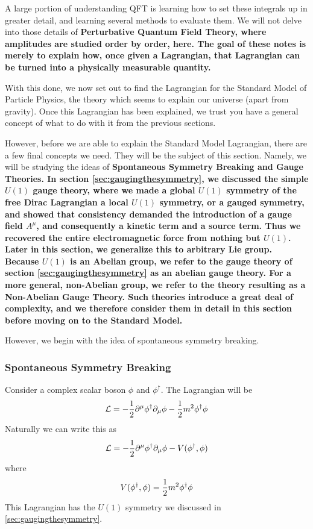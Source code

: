 \documentclass[12pt,epsf]{article}
\def\nolabel{\nonumber }
\def\nolabel{\nonumber }
\begin{document}
A large portion of understanding QFT is learning how to set these
integrals up in greater detail, and learning several methods to
evaluate them.	We will not delve into those details of \bf
Perturbative Quantum Field Theory\rm, where amplitudes are studied
order by order, here.  The goal of these notes is merely to explain
how, once given a Lagrangian, that Lagrangian can be turned into a
physically measurable quantity.  

With this done, we now set out to find the Lagrangian for the Standard
Model of Particle Physics, the theory which seems to explain our
universe (apart from gravity).	Once this Lagrangian has been
explained, we trust you have a general concept of what to do with it
from the previous sections.  

However, before we are able to explain the Standard Model Lagrangian,
there are a few final concepts we need.  They will be the subject of
this section.  Namely, we will be studying the ideas of \bf Spontaneous
Symmetry Breaking \rm and \bf Gauge Theories\rm.  In section
\ref{sec:gaugingthesymmetry}, we discussed the simple $U(1)$ gauge
theory, where we made a global $U(1)$ symmetry of the free Dirac
Lagrangian a local $U(1)$ symmetry, or a gauged symmetry, and showed
that consistency demanded the introduction of a gauge field $A^{\mu}$,
and consequently a kinetic term and a source term.  Thus we recovered
the entire electromagnetic force from nothing but $U(1)$.  Later in
this section, we generalize this to arbitrary Lie group.  Because
$U(1)$ is an Abelian group, we refer to the gauge theory of section
\ref{sec:gaugingthesymmetry} as an abelian gauge theory.  For a more
general, non-Abelian group, we refer to the theory resulting as a \bf
Non-Abelian Gauge Theory\rm.  Such theories introduce a great deal of
complexity, and we therefore consider them in detail in this section
before moving on to the Standard Model.  

However, we begin with the idea of spontaneous symmetry
breaking.  

\subsubsection{Spontaneous Symmetry Breaking}
\label{sec:spontaneoussymmetrybreaking}

Consider a complex scalar boson $\phi$ and $\phi^{\dagger}$.  The
Lagrangian will be 
\begin{eqnarray}
\mathcal{L} = -{1\over 2} \partial^{\mu}\phi^{\dagger}\partial_{\mu}
\phi - {1\over 2} m^2 \phi^{\dagger}\phi\nolabel
\end{eqnarray}
Naturally we can write this as 
\begin{eqnarray}
\mathcal{L}  = -{1\over 2}\partial^{\mu}\phi^{\dagger}\partial_{\mu}
\phi - V(\phi^{\dagger},\phi) \label{eq:morefundamental}
\end{eqnarray}
where 
\begin{eqnarray}
V(\phi^{\dagger},\phi) = {1\over 2}m^2\phi^{\dagger}\phi\nolabel
\end{eqnarray}
This Lagrangian has the $U(1)$ symmetry we discussed in
\ref{sec:gaugingthesymmetry}.  
\end{document}
